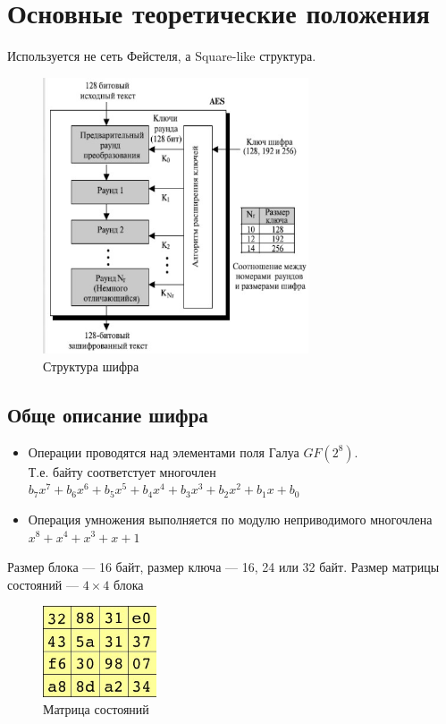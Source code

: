 \documentclass[a4paper, 14pt]{extarticle}
\begin{document}
\section{Основные теоретические положения}
Используется не сеть Фейстеля, а Square-like структура.
\begin{figure}[h]
    \centering
    \includegraphics[width=0.7\textwidth]{img/S001.jpg}
    \caption{Структура шифра}%
\end{figure}

\subsection{Обще описание шифра}
\begin{itemize}
    \item Операции проводятся над элементами поля Галуа $GF(2^8)$.\\
    Т.е. байту соответстует многочлен $b_7 x^7 + b_6 x^6 + b_5 x^5 + b_4 x^4 + b_3 x^3 + b_2 x^2 + b_1 x + b_0$
    \item Операция умножения выполняется по модулю неприводимого многочлена $ x^8 + x^4 + x^3 + x + 1 $\\
\end{itemize}
Размер блока --- 16 байт, размер ключа --- 16, 24 или 32 байт. Размер матрицы состояний --- $4\times4$ блока

\begin{figure}[h]
    \centering
    \includegraphics[width=0.3\textwidth]{img/S002.jpg}
    \caption{Матрица состояний}
\end{figure}
\end{document}
